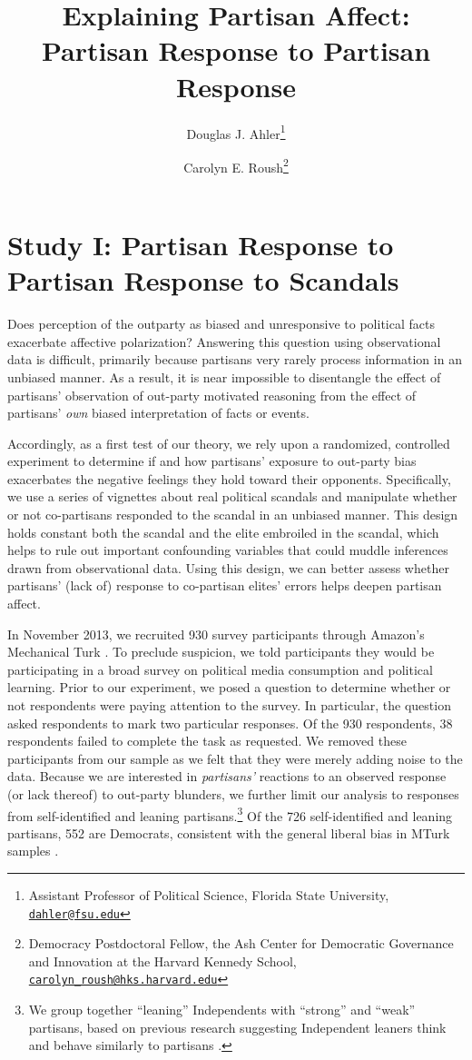 \documentclass[12pt, letterpaper]{article}
\title{Explaining Partisan Affect: Partisan Response to Partisan Response}
\author{Douglas J. Ahler\thanks{Assistant Professor of Political Science, Florida State University, \href{mailto:dahler@fsu.edu}{\texttt{dahler@fsu.edu}}} \and Carolyn E. Roush\thanks{Democracy Postdoctoral Fellow, the Ash Center for Democratic Governance and Innovation at the Harvard Kennedy School, \href{mailto:carolyn_roush@hks.harvard.edu}{\texttt{carolyn\_roush@hks.harvard.edu}}}}
\begin{document}
\maketitle
\thispagestyle{empty}

\begin{abstract}

\noindent 

\end{abstract}

\newpage
\doublespacing

\section*{Study I: Partisan Response to Partisan Response to Scandals}

Does perception of the outparty as biased and unresponsive to political facts exacerbate affective polarization? Answering this question using observational data is difficult, primarily because partisans very rarely process information in an unbiased manner. As a result, it is near impossible to disentangle the effect of partisans' observation of out-party motivated reasoning from the effect of partisans' \textit{own} biased interpretation of facts or events. 

Accordingly, as a first test of our theory, we rely upon a randomized, controlled experiment to determine if and how partisans' exposure to out-party bias exacerbates the negative feelings they hold toward their opponents. Specifically, we use a series of vignettes about real political scandals and manipulate whether or not co-partisans responded to the scandal in an unbiased manner. This design holds constant both the scandal and the elite embroiled in the scandal, which helps to rule out important confounding variables that could muddle inferences drawn from observational data. Using this design, we can better assess whether partisans' (lack of) response to co-partisan elites' errors helps deepen partisan affect. 

In November 2013, we recruited 930 survey participants through Amazon's Mechanical Turk \citep[see][]{BerinskyHuberLenz2012}. To preclude suspicion, we told participants they would be participating in a broad survey on political media consumption and political learning. Prior to our experiment, we posed a question to determine whether or not respondents were paying attention to the survey. In particular, the question asked respondents to mark two particular responses. Of the 930 respondents, 38 respondents failed to complete the task as requested. We removed these participants from our sample as we felt that they were merely adding noise to the data. Because we are interested in \textit{partisans'} reactions to an observed response (or lack thereof) to out-party blunders, we further limit our analysis to responses from self-identified and leaning partisans.\footnote{We group together ``leaning'' Independents with ``strong'' and ``weak'' partisans, based on previous research suggesting Independent leaners think and behave similarly to partisans \citep{keithetal_1992}.} Of the 726 self-identified and leaning partisans, 552 are Democrats, consistent with the general liberal bias in MTurk samples \citep{BerinskyHuberLenz2012}. 
\end{document}
